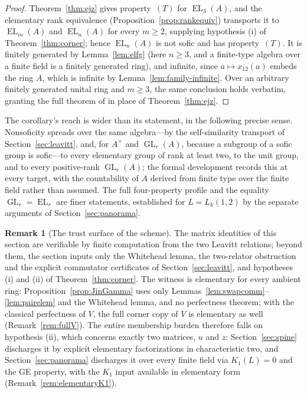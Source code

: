 \documentclass[11pt]{amsart}
\theoremstyle{definition}
\newtheorem{remark}[theorem]{Remark}
\theoremstyle{plain}
\newcommand{\GL}{\operatorname{GL}}
\newcommand{\EL}{\operatorname{EL}}
\begin{document}
\begin{proof}
Theorem~\ref{thm:ejz} gives property~\((T)\) for \(\EL_3(A)\), and the elementary rank equivalence (Proposition~\ref{prop:rankequiv}) transports it to \(\EL_m(A)\) and \(\EL_n(A)\) for every \(m\geq2\), supplying hypothesis (i) of Theorem~\ref{thm:corner}; hence \(\EL_n(A)\) is not sofic and has property~\((T)\).  It is finitely generated by Lemma~\ref{lem:elfg} (here \(n\geq3\), and a finite-type algebra over a finite field is a finitely generated ring), and infinite, since \(a\mapsto x_{12}(a)\) embeds the ring \(A\), which is infinite by Lemma~\ref{lem:family-infinite}.  Over an arbitrary finitely generated unital ring and \(m\geq3\), the same conclusion holds verbatim, granting the full theorem of \cite{ErshovJaikin10} in place of Theorem~\ref{thm:ejz}.
\end{proof}

The corollary's reach is wider than its statement, in the following precise sense.  Nonsoficity spreads over the same algebra---by the self-similarity transport of Section~\ref{sec:leavitt}, and, for \(A^\times\) and \(\GL_r(A)\), because a subgroup of a sofic group is sofic---to every elementary group of rank at least two, to the unit group, and to every positive-rank \(\GL_r(A)\); the formal development records this at every target, with the countability of \(A\) derived from finite type over the finite field rather than assumed.  The full four-property profile and the equality \(\GL_r=\EL_r\) are finer statements, established for \(L=L_k(1,2)\) by the separate arguments of Section~\ref{sec:panorama}.

\begin{remark}[The trust surface of the scheme]\label{rem:memberships}
The matrix identities of this section are verifiable by finite computation from the two Leavitt relations; beyond them, the section inputs only the Whitehead lemma, the two-relator obstruction and the explicit commutator certificates of Section~\ref{sec:leavitt}, and hypotheses (i) and (ii) of Theorem~\ref{thm:corner}.  The witness is elementary for every ambient ring: Proposition~\ref{prop:JinGamma} uses only Lemmas~\ref{lem:swapcomm}--\ref{lem:pairelem} and the Whitehead lemma, and no perfectness theorem; with the classical perfectness of \(V\), the full corner copy of \(V\) is elementary as well (Remark~\ref{rem:fullV}).  The entire membership burden therefore falls on hypothesis (ii), which concerns exactly two matrices, \(u\) and \(z\): Section~\ref{sec:spine} discharges it by explicit elementary factorizations in characteristic two, and Section~\ref{sec:panorama} discharges it over every finite field via \(K_1(L)=0\) and the GE property, with the \(K_1\) input available in elementary form (Remark~\ref{rem:elementaryK1}).
\end{remark}
\end{document}
